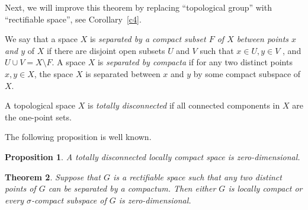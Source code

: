 \documentclass[psamsfonts,fceqn,leqno]{amsart}
\newtheorem{theorem}{Theorem}[section]
\newtheorem{proposition}[theorem]{Proposition}
\theoremstyle{definition}
\begin{document}
Next, we will improve this theorem by replacing ``topological group'' with ``rectifiable space'', see Corollary~\ref{c4}.

We say that a space $X$ is {\it separated by a compact subset $F$ of $X$ between points $x$ and $y$} \cite{A2014}
of $X$ if there are disjoint open subsets $U$ and $V$ such that $x\in U, y\in V$ , and $U\cup V=X\setminus F$.
A space $X$ is {\it separated by compacta} \cite{A2014} if for any two distinct points $x, y\in X$, the space $X$ is
separated between $x$ and $y$ by some compact subspace of $X$.

A topological space $X$ is {\it totally disconnected} if all connected components in $X$ are the one-point sets.

The following proposition is well known.

\begin{proposition}\label{p2}
A totally disconnected locally compact space is zero-dimensional.
\end{proposition}

\begin{theorem}\label{t000}
Suppose that $G$ is a rectifiable space such that any
two distinct points of $G$ can be separated by a compactum. Then either $G$ is locally compact or every $\sigma$-compact subspace
of $G$ is zero-dimensional.
\end{theorem}
\end{document}
